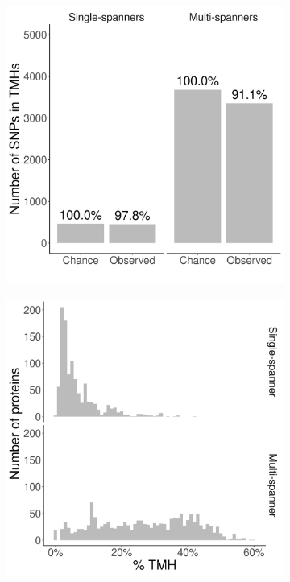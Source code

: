 \begin{figure}[!htbp]
  \centering
  \begin{subfigure}[t]{0.45\textwidth}
    \centering
    \caption{}
    \includegraphics[width=\linewidth]{ncbi_peregrine_results/fig_conservation_per_spanner.png}
    \label{fig:conservation_per_spanner}
  \end{subfigure}
  \hfill
  \begin{subfigure}[t]{0.45\textwidth}
    \centering
    \caption{}
    \includegraphics[width=\linewidth]{ncbi_peregrine_results/fig_f_tmh_ncbi_per_spanner.png}
    \label{fig:f_tmh_ncbi_per_spanner}
  \end{subfigure}  


\end{figure}
